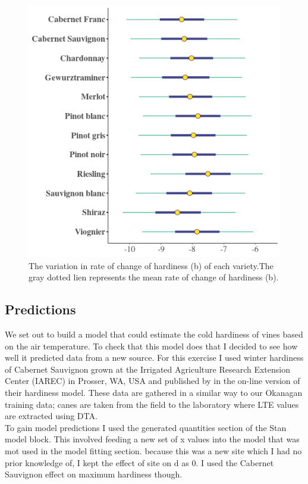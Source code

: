 \documentclass[11pt,letter]{article}
\begin{document}
\begin{figure}
  \includegraphics[scale = 0.75]{varBs.png}
  \caption{The variation in rate of change of hardiness (b) of each variety.The gray dotted lien represents the mean rate of change of hardiness (b).}
  \label{fig:varBs}
\end{figure}



\subsection{Predictions}
We set out to build a model that could estimate the cold hardiness of vines based on the air temperature. To check that this model does that I decided to see how well it predicted data from a new source. For this exercise I used winter hardiness of Cabernet Sauvignon grown at the Irrigated Agriculture Research Extension Center (IAREC) in Prosser, WA, USA and published by \cite{Ferguson2014} in the on-line version of their hardiness model. These data are gathered in a similar way to our Okanagan training data; canes are taken from the field to the laboratory where LTE values are extracted using DTA. \\

To gain model predictions I used the generated quantities section of the Stan model block. This involved feeding a new set of x values into the model that was mot used in the model fitting section. because this was a new site which I had no prior knowledge of, I kept the effect of site on d as 0. I used the Cabernet Sauvignon effect on maximum hardiness though. \\
\end{document}
